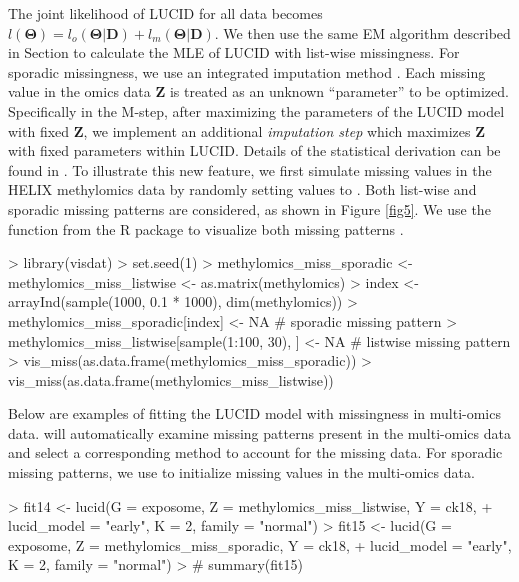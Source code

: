 The joint likelihood of LUCID for all data becomes $l(\bm{\Theta}) = l_o (\bm{\Theta}|\bm{D}) +l_m (\bm{\Theta}|\bm{D})$. We then use the same EM algorithm described in Section  to calculate the MLE of LUCID with list-wise missingness.
For sporadic missingness, we use an integrated imputation method \citep{zhang2021gaussian}. Each missing value in the omics data $\bm Z$ is treated as an unknown ``parameter'' to be optimized. Specifically in the M-step, after maximizing the parameters of the LUCID model with fixed $\bm Z$, we implement an additional \emph{imputation step} which maximizes $\bm Z$ with fixed parameters within LUCID. Details of the statistical derivation can be found in \citet{zhang2021gaussian}.
To illustrate this new feature, we first simulate missing values in the HELIX methylomics data by randomly setting values to . Both list-wise and sporadic missing patterns are considered, as shown in Figure \ref{fig5}. We use the  function from the R package  to visualize both missing patterns \citep{visdat}.
\begin{example}
> library(visdat)
> set.seed(1)
> methylomics_miss_sporadic <- methylomics_miss_listwise <- as.matrix(methylomics)
> index <- arrayInd(sample(1000, 0.1 * 1000), dim(methylomics))
> methylomics_miss_sporadic[index] <- NA # sporadic missing pattern
> methylomics_miss_listwise[sample(1:100, 30), ] <- NA # listwise missing pattern
> vis_miss(as.data.frame(methylomics_miss_sporadic))
> vis_miss(as.data.frame(methylomics_miss_listwise))
\end{example}
Below are examples of fitting the LUCID model with missingness in multi-omics data.  will automatically examine missing patterns present in the multi-omics data and select a corresponding method to account for the missing data. For sporadic missing patterns, we use  to initialize missing values in the multi-omics data.
\begin{example}
> fit14 <- lucid(G = exposome, Z = methylomics_miss_listwise, Y = ck18,
+                lucid_model = "early", K = 2, family = "normal")
> fit15 <- lucid(G = exposome, Z = methylomics_miss_sporadic, Y = ck18,
+                lucid_model = "early", K = 2, family = "normal")
> # summary(fit15)
\end{example}
